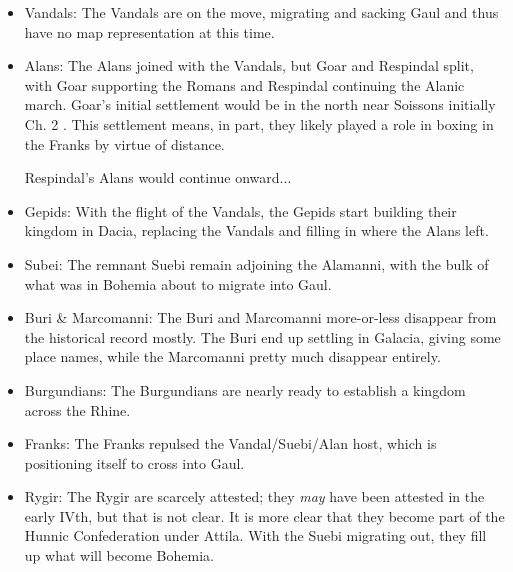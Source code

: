 \documentclass{article}
\newcommand{\specificCite}[1]{\tiny #1 \normalsize}
\begin{document}
\begin{itemize}
		\item Vandals:\newline
		The Vandals are on the move, migrating and sacking Gaul and thus have no map representation at this time.
		
		\item Alans:\newline
		The Alans joined with the Vandals, but Goar and Respindal split, with Goar supporting the Romans and Respindal continuing the Alanic march.
		Goar's initial settlement would be in the north near Soissons initially \cite{BachrachAlans}\specificCite{Ch. 2}.
		This settlement means, in part, they likely played a role in boxing in the Franks by virtue of distance.
		
		Respindal's Alans would continue onward...
		
		\item Gepids:\newline
		With the flight of the Vandals, the Gepids start building their kingdom in Dacia, replacing the Vandals and filling in where the Alans left.
		
		\item Subei:\newline
		The remnant Suebi remain adjoining the Alamanni, with the bulk of what was in Bohemia about to migrate into Gaul.
		
		\item Buri \& Marcomanni:\newline
		The Buri and Marcomanni more-or-less disappear from the historical record mostly.
		The Buri end up settling in Galacia, giving some place names, while the Marcomanni pretty much disappear entirely.
		
		\item Burgundians:\newline
		The Burgundians are nearly ready to establish a kingdom across the Rhine.
		
		\item Franks:\newline
		The Franks repulsed the Vandal/Suebi/Alan host, which is positioning itself to cross into Gaul.
		
		\item Rygir:\newline
		The Rygir are scarcely attested; they \textit{may} have been attested in the early IVth, but that is not clear.
		It is more clear that they become part of the Hunnic Confederation under Attila.
		With the Suebi migrating out, they fill up what will become Bohemia.
		

\end{itemize}
\end{document}
